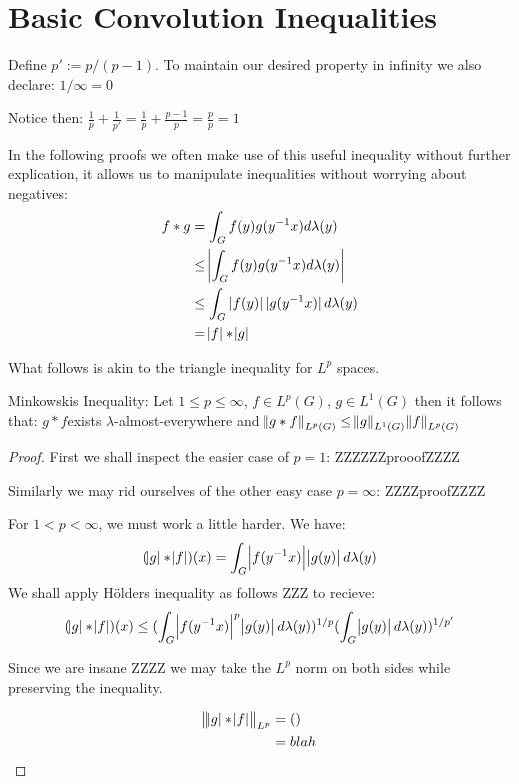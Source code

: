 \section{Basic Convolution Inequalities}

\begin{definition}
Define $ p' := p / (p-1) $. To maintain our desired property in infinity we also declare: $1 / \infty = 0$
\end{definition}

\begin{remark}
Notice then: $\frac{1}{p} + \frac{1}{p'} = \frac{1}{p} + \frac{p-1}{p} = \frac{p}{p} = 1$
\end{remark}

\begin{remark}
In the following proofs we often make use of this useful inequality without further explication, it allows us to manipulate inequalities without worrying about negatives:
\begin{align*}
f \ast g &= \int_G f(y)g(y^{-1}x) d\lambda(y) \\
&\leq \abs{ \int_G f(y)g(y^{-1}x) d\lambda(y) } \\
&\leq \int_G \abs[0]{f(y)}\abs[0]{g(y^{-1}x)} d\lambda(y) \\
&= \abs{f} \ast \abs{g}
\end{align*}
\end{remark}

What follows is akin to the triangle inequality for $L^p$ spaces.

\begin{theorem}
Minkowskis Inequality: Let $1 \leq p \leq \infty$, $f \in L^p (G)$, $g \in L^1(G)$ then it follows that: 
$g \ast f $exists $\lambda$-almost-everywhere and
$ \norm{g \ast f}_{L^p(G)} \leq \norm{g}_{L^1(G)} \norm{f}_{L^p(G)} $
\end{theorem}

\begin{proof}
First we shall inspect the easier case of $p=1$:
ZZZZZZprooofZZZZ


Similarly we may rid ourselves of the other easy case $p=\infty$:
ZZZZproofZZZZ

For $ 1 < p < \infty$, we must work a little harder. We have:
\begin{equation*}
(\abs{g} \ast \abs{f} )(x) = \int_G \abs{f(y^{-1}x)}\abs{g(y)} d\lambda(y)
\end{equation*}
We shall apply H\"olders inequality as follows ZZZ to recieve:
\begin{equation*}
(\abs{g} \ast \abs{f} )(x) \leq (\int_G \abs{f(y^{-1}x)}^p \abs{g(y)} d\lambda(y))^{1/p} (\int_G \abs{g(y)} d\lambda(y))^{1/p'}
\end{equation*}

Since we are insane ZZZZ we may take the $L^p$ norm on both sides while preserving the inequality.

\begin{align*}
\norm{\abs{g} \ast \abs{f}}_{L^p} &= () \\
&= blah
\end{align*}

\end{proof}

